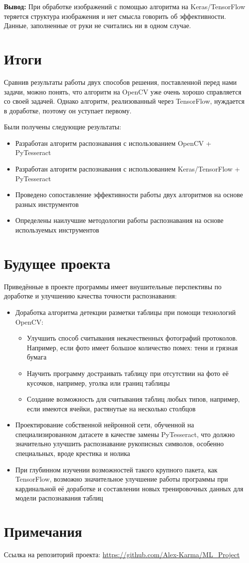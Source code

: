 \documentclass[a4paper, 12pt]{report}
\begin{document}
\textbf{Вывод:} При обработке изображений с помощью алгоритма на Keras/TensorFlow теряется структура изображения и нет смысла говорить об эффективности. Данные, заполненные от руки не считались ни в одном случае.
\pagebreak

\section{Итоги}
Сравнив результаты работы двух способов решения, поставленной перед нами задачи, можно понять, что алгоритм на OpenCV уже очень хорошо справляется со своей задачей. Однако алгоритм, реализованный через TensorFlow, нуждается в доработке, поэтому он уступает первому.

Были получены следующие результаты:
\begin{itemize}
  \item Разработан алгоритм распознавания с использованием OpenCV + PyTesseract
  \item Разработан алгоритм распознавания с использованием Keras/TensorFlow + PyTesseract
  \item Проведено сопоставление эффективности работы двух алгоритмов на основе разных инструментов
  \item Определены наилучшие методологии работы распознавания на основе используемых инструментов
\end{itemize}

\section{Будущее проекта}
Приведённые в проекте программы имеет внушительные перспективы по доработке и улучшению качества точности распознавания:
\begin{itemize}
  \item Доработка алгоритма детекции разметки таблицы при помощи технологий OpenCV:
  \begin{itemize} 
  \item Улучшить способ считывания некачественных фотографий протоколов. Например, если фото имеет большое количество помех: тени и грязная бумага
  \item Научить программу достраивать таблицу при отсутствии на фото её кусочков, например, уголка или границ таблицы
  \item Создание возможность для считывания таблиц любых типов, например, если имеются ячейки, растянутые на несколько столбцов
  \end{itemize}
  
  \item Проектирование собственной нейронной сети, обученной на специализированном датасете в качестве замены PyTesseract, что должно значительно улучшить распознавание рукописных символов, особенно специальных, вроде крестика и нолика
  \item При глубинном изучении возможностей такого крупного пакета, как TensorFlow, возможно значительное улучшение работы программы при кардинальной её доработке и составлении новых тренировочных данных для модели распознавания таблиц
\end{itemize}

\section{Примечания}
Ссылка на репозиторий проекта: \url{https://github.com/Alex-Karma/ML_Project}
\end{document}
